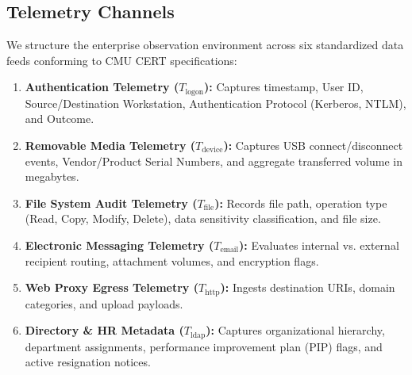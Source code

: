 \documentclass[conference]{IEEEtran}
\begin{document}
\subsection{Telemetry Channels}
We structure the enterprise observation environment across six standardized data feeds conforming to CMU CERT specifications:
\begin{enumerate}
    \item \textbf{Authentication Telemetry ($T_{\text{logon}}$):} Captures timestamp, User ID, Source/Destination Workstation, Authentication Protocol (Kerberos, NTLM), and Outcome.
    \item \textbf{Removable Media Telemetry ($T_{\text{device}}$):} Captures USB connect/disconnect events, Vendor/Product Serial Numbers, and aggregate transferred volume in megabytes.
    \item \textbf{File System Audit Telemetry ($T_{\text{file}}$):} Records file path, operation type (Read, Copy, Modify, Delete), data sensitivity classification, and file size.
    \item \textbf{Electronic Messaging Telemetry ($T_{\text{email}}$):} Evaluates internal vs. external recipient routing, attachment volumes, and encryption flags.
    \item \textbf{Web Proxy Egress Telemetry ($T_{\text{http}}$):} Ingests destination URIs, domain categories, and upload payloads.
    \item \textbf{Directory \& HR Metadata ($T_{\text{ldap}}$):} Captures organizational hierarchy, department assignments, performance improvement plan (PIP) flags, and active resignation notices.
\end{enumerate}
\end{document}
